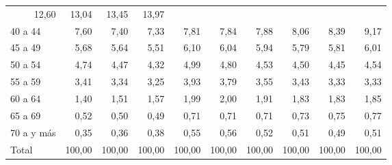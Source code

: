 \begin{tabular}{llllllllll}
  \multicolumn{1}{r}{12,60} &
  \multicolumn{1}{r}{13,04} &
  \multicolumn{1}{r}{13,45} &
  \multicolumn{1}{r}{13,97} \\
\multicolumn{1}{l}{\hspace{1em}40 a 44} &
  \multicolumn{1}{|r}{7,60} &
  \multicolumn{1}{r}{7,40} &
  \multicolumn{1}{r}{7,33} &
  \multicolumn{1}{r}{7,81} &
  \multicolumn{1}{r}{7,84} &
  \multicolumn{1}{r}{7,88} &
  \multicolumn{1}{r}{8,06} &
  \multicolumn{1}{r}{8,39} &
  \multicolumn{1}{r}{9,17} \\
\multicolumn{1}{l}{\hspace{1em}45 a 49} &
  \multicolumn{1}{|r}{5,68} &
  \multicolumn{1}{r}{5,64} &
  \multicolumn{1}{r}{5,51} &
  \multicolumn{1}{r}{6,10} &
  \multicolumn{1}{r}{6,04} &
  \multicolumn{1}{r}{5,94} &
  \multicolumn{1}{r}{5,79} &
  \multicolumn{1}{r}{5,81} &
  \multicolumn{1}{r}{6,01} \\
\multicolumn{1}{l}{\hspace{1em}50 a 54} &
  \multicolumn{1}{|r}{4,74} &
  \multicolumn{1}{r}{4,47} &
  \multicolumn{1}{r}{4,32} &
  \multicolumn{1}{r}{4,99} &
  \multicolumn{1}{r}{4,80} &
  \multicolumn{1}{r}{4,53} &
  \multicolumn{1}{r}{4,50} &
  \multicolumn{1}{r}{4,45} &
  \multicolumn{1}{r}{4,54} \\
\multicolumn{1}{l}{\hspace{1em}55 a 59} &
  \multicolumn{1}{|r}{3,41} &
  \multicolumn{1}{r}{3,34} &
  \multicolumn{1}{r}{3,25} &
  \multicolumn{1}{r}{3,93} &
  \multicolumn{1}{r}{3,79} &
  \multicolumn{1}{r}{3,55} &
  \multicolumn{1}{r}{3,43} &
  \multicolumn{1}{r}{3,33} &
  \multicolumn{1}{r}{3,33} \\
\multicolumn{1}{l}{\hspace{1em}60 a 64} &
  \multicolumn{1}{|r}{1,40} &
  \multicolumn{1}{r}{1,51} &
  \multicolumn{1}{r}{1,57} &
  \multicolumn{1}{r}{1,99} &
  \multicolumn{1}{r}{2,00} &
  \multicolumn{1}{r}{1,91} &
  \multicolumn{1}{r}{1,83} &
  \multicolumn{1}{r}{1,83} &
  \multicolumn{1}{r}{1,85} \\
\multicolumn{1}{l}{\hspace{1em}65 a 69} &
  \multicolumn{1}{|r}{0,52} &
  \multicolumn{1}{r}{0,50} &
  \multicolumn{1}{r}{0,49} &
  \multicolumn{1}{r}{0,71} &
  \multicolumn{1}{r}{0,71} &
  \multicolumn{1}{r}{0,71} &
  \multicolumn{1}{r}{0,73} &
  \multicolumn{1}{r}{0,75} &
  \multicolumn{1}{r}{0,77} \\
\multicolumn{1}{l}{\hspace{1em}70 a y más} &
  \multicolumn{1}{|r}{0,35} &
  \multicolumn{1}{r}{0,36} &
  \multicolumn{1}{r}{0,38} &
  \multicolumn{1}{r}{0,55} &
  \multicolumn{1}{r}{0,56} &
  \multicolumn{1}{r}{0,52} &
  \multicolumn{1}{r}{0,51} &
  \multicolumn{1}{r}{0,49} &
  \multicolumn{1}{r}{0,51} \\
\multicolumn{1}{l}{\hspace{1em}Total} &
  \multicolumn{1}{|r}{100,00} &
  \multicolumn{1}{r}{100,00} &
  \multicolumn{1}{r}{100,00} &
  \multicolumn{1}{r}{100,00} &
  \multicolumn{1}{r}{100,00} &
  \multicolumn{1}{r}{100,00} &
  \multicolumn{1}{r}{100,00} &
  \multicolumn{1}{r}{100,00} &
  \multicolumn{1}{r}{100,00} \\
\cline{1-10}
\end{tabular}
